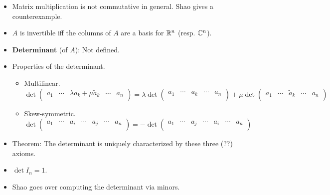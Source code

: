 \documentclass[../notes.tex]{subfiles}
\begin{document}
\begin{itemize}
\begin{equation*}
    \end{equation*}
    \item Matrix multiplication is not commutative in general. Shao gives a counterexample.
    \item $A$ is invertible iff the columns of $A$ are a basis for $\mathbb{R}^n$ (resp. $\mathbb{C}^n$).
    \item \textbf{Determinant} (of $A$): Not defined.
    \item Properties of the determinant.
    \begin{itemize}
        \item Multilinear.
        \begin{equation*}
            \det
            \begin{pmatrix}
                a_1 & \cdots & \lambda a_k+\mu\tilde{a}_k & \cdots & a_n\\
            \end{pmatrix}
            = \lambda\det
            \begin{pmatrix}
                a_1 & \cdots & a_k & \cdots & a_n\\
            \end{pmatrix}
            +\mu\det
            \begin{pmatrix}
                a_1 & \cdots & \tilde{a}_k & \cdots & a_n\\
            \end{pmatrix}
        \end{equation*}
        \item Skew-symmetric.
        \begin{equation*}
            \det
            \begin{pmatrix}
                a_1 & \cdots & a_i & \cdots & a_j & \cdots & a_n\\
            \end{pmatrix}
            = -\det
            \begin{pmatrix}
                a_1 & \cdots & a_j & \cdots & a_i & \cdots & a_n\\
            \end{pmatrix}
        \end{equation*}
    \end{itemize}
    \item Theorem: The determinant is uniquely characterized by these three (??) axioms.
    \item $\det I_n=1$.
    \item Shao goes over computing the determinant via minors.

\end{itemize}
\end{document}
